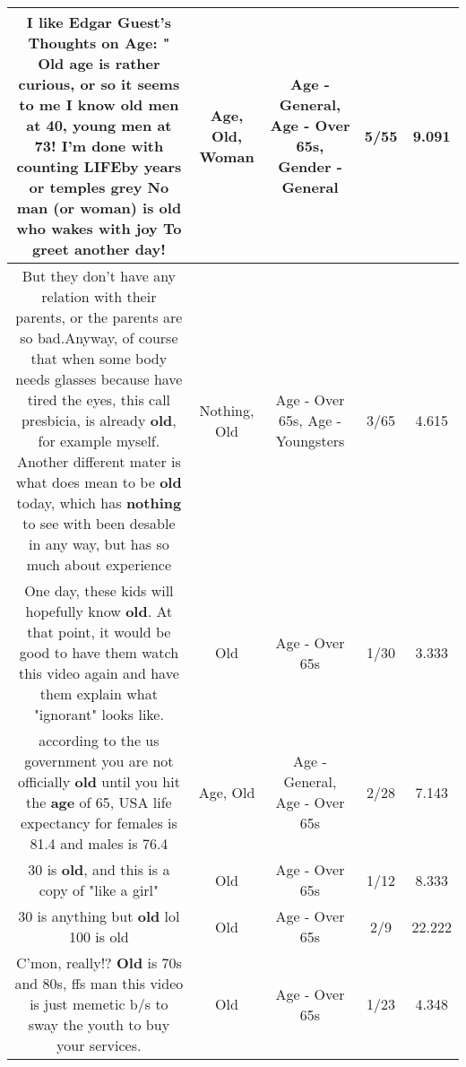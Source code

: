 \documentclass[11pt]{article}
\newlength\mylength
\begin{document}
\begin{center}
\begin{longtable}{|C{.65\mylength}|C{.30\mylength}|C{.12\mylength}|C{.12\mylength}|C{.12\mylength}|}
  \small I like Edgar Guest's Thoughts on \textbf{Age}: " \textbf{Old} \textbf{age} is rather curious, or so it seems to me   I know \textbf{old} men at 40, young men at  73!   I'm done with counting LIFEby years or temples grey No man (or \textbf{woman}) is \textbf{old} who wakes with joy   To greet another day!\normalsize   & Age, Old, Woman & Age - General, Age - Over 65s, Gender - General & 5/55 & 9.091 \\  \hline
  \small But they don't have any relation with their parents, or the parents are so bad.Anyway, of course that when some body needs glasses because have tired the eyes, this call presbicia, is already \textbf{old}, for example myself. Another different mater is what does mean to be \textbf{old} today, which has \textbf{nothing} to see with been desable in any way, but has so much about experience\normalsize   & Nothing, Old & Age - Over 65s, Age - Youngsters & 3/65 & 4.615 \\  \hline
  \small One day, these kids will hopefully know \textbf{old}. At that point, it would be good to have them watch this video again and have them explain what "ignorant" looks like.\normalsize   & Old & Age - Over 65s & 1/30 & 3.333 \\  \hline
  \small according to the us government you are not officially \textbf{old} until you hit the \textbf{age} of 65,  USA life expectancy for females is 81.4 and males is 76.4\normalsize   & Age, Old & Age - General, Age - Over 65s & 2/28 & 7.143 \\  \hline
  \small 30 is \textbf{old}, and this is a copy of "like a girl"\normalsize   & Old & Age - Over 65s & 1/12 & 8.333 \\  \hline
  \small 30 is anything but \textbf{old}  lol   100 is old\normalsize   & Old & Age - Over 65s & 2/9 & 22.222 \\  \hline
  \small C'mon, really!? \textbf{Old} is 70s and 80s, ffs man this video is just memetic b/s to sway the youth to buy your services.\normalsize   & Old & Age - Over 65s & 1/23 & 4.348 \\  \hline

\end{longtable}
\end{center}
\end{document}
